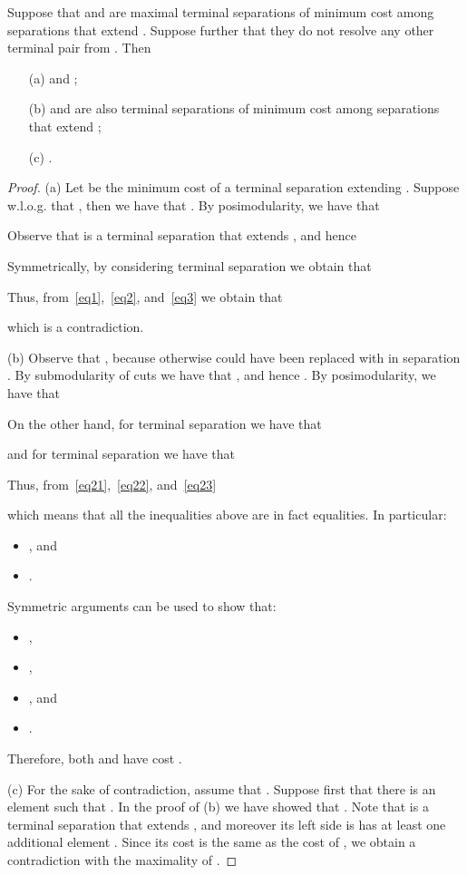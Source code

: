 \begin{lemma}\label{lem:patch}
Suppose that  and  are maximal terminal separations of minimum cost among separations that extend . Suppose further that they do not resolve any other terminal pair from . Then
\begin{itemize}
\item[(a)]  and ;
\item[(b)]  and  are also terminal separations of minimum cost among separations that extend ;
\item[(c)] .
\end{itemize}
\end{lemma}
\begin{proof}
\noindent (a) Let  be the minimum cost of a terminal separation extending . Suppose w.l.o.g. that , then we have that . By posimodularity, we have that

Observe that  is a terminal separation that extends , and hence 

Symmetrically, by considering terminal separation  we obtain that

Thus, from~\eqref{eq1},~\eqref{eq2}, and~\eqref{eq3} we obtain that

which is a contradiction.

\smallskip

\noindent (b) Observe that , because otherwise  could have been replaced with  in separation . By submodularity of cuts we have that , and hence . By posimodularity, we have that

On the other hand, for terminal separation  we have that

and for terminal separation  we have that

Thus, from~\eqref{eq21},~\eqref{eq22}, and~\eqref{eq23}

which means that all the inequalities above are in fact equalities. In particular:
\begin{itemize}
\item , and 
\item .
\end{itemize} 
Symmetric arguments can be used to show that:
\begin{itemize}
\item , 
\item , 
\item , and
\item .
\end{itemize}
Therefore, both  and  have cost .

\smallskip

\noindent (c) For the sake of contradiction, assume that . Suppose first that there is an element  such that . In the proof of (b) we have showed that . Note that  is a terminal separation that extends , and moreover its left side is has at least one additional element . Since its cost is the same as the cost of , we obtain a contradiction with the maximality of .
\end{proof}

